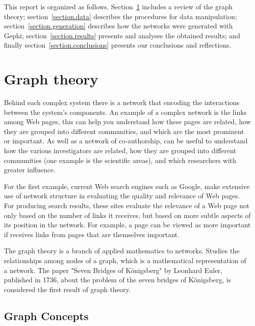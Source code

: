 \documentclass{article}
\begin{document}
\begin{multicols}{2}
This report is organized as follows. Section~\ref{section.graphtheory} includes a review of the graph theory; section~\ref{section.data} describes the procedures for data manipulation;  section~\ref{section.generation} describes how the networks were generated with Gephi; section~\ref{section.results} presents and  analyses the obtained results; and finally section~\ref{section.conclusions} presents our conclusions and reflections.



\section{Graph theory}
\label{section.graphtheory}

Behind each complex system there is a network that encoding the interactions between the system's components. An example of a complex network is the links among Web pages, this can help you understand how these pages are related, how they are grouped into different communities, and which are the most prominent or important.\cite{NS} As well as a network of co-authorship, can be useful to understand how the various investigators are related, how they are grouped into different communities (one example is the scientific areas), and which researchers with greater influence.

For the first example, current Web search engines such as Google, make extensive use of network structure in evaluating the quality and relevance of Web pages. For producing search results, these sites evaluate the relevance of a Web page not only based on the number of links it receives, but based on more subtle aspects of its position in the network. For example, a page can be viewed as more important if receives links from pages that are themselves important.\cite{NS}

The graph theory is a branch of applied mathematics to networks. Studies the relationships among nodes of a graph, which is a mathematical representation of a network.\cite{networklit} The paper "Seven Bridges of Königsberg" by Leonhard Euler, published in 1736, about the problem of the seven bridges of Königsberg, is considered the first result of graph theory.


\subsection{Graph Concepts}


\end{multicols}
\end{document}
